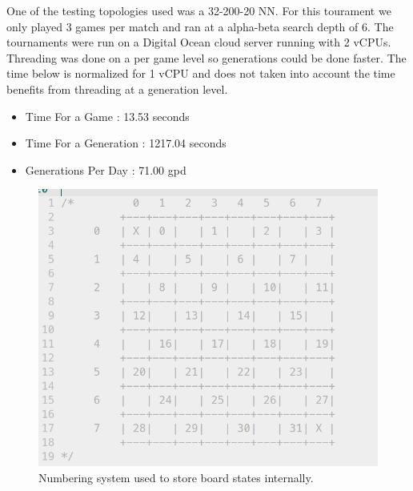 \documentclass{article}
\begin{document}
One of the testing topologies used was a 32-200-20 NN. For this tourament we only
played 3 games per match and ran at a alpha-beta search depth of 6. The tournaments
were run on a Digital Ocean cloud server running with 2 vCPUs. Threading was done
on a per game level so generations could be done faster. The time below is normalized for
1 vCPU and does not taken into account the time benefits from threading at a generation
level.

\begin{itemize}
    \item Time For a Game       : 13.53 seconds
    \item Time For a Generation : 1217.04 seconds
    \item Generations Per Day   : 71.00 gpd
\end{itemize}

\begin{figure}
    \includegraphics[width=\linewidth]{images/board-key.png}
    \caption{Numbering system used to store board states internally.}
    \label{fig:board-key}
\end{figure}
\end{document}
